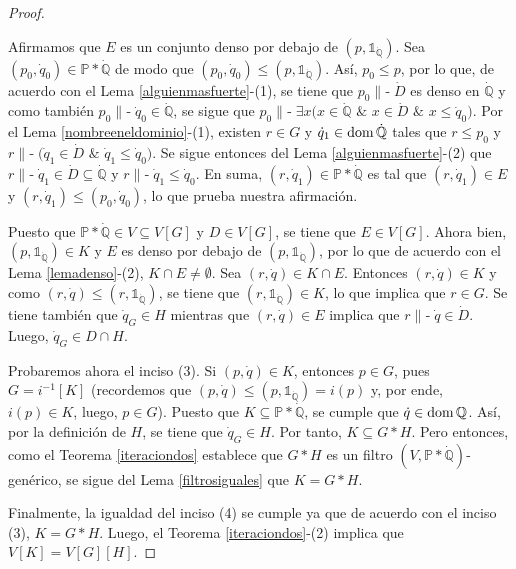 \documentclass[11pt]{unam_tesis1}
\theoremstyle{MyThmStyle}
\theoremstyle{definition}
\theoremstyle{plain}
\theoremstyle{remark}
\def\dom{\mathop{\rm dom}\nolimits}
\def\forces{\mathop{\parallel\!\!\!-}\nolimits}
\let\Vdash\forces
\let\leq\leqslant
\begin{document}
\begin{proof}
\begin{center}
\end{center}

Afirmamos que $E$ es un conjunto denso por debajo de $(p,\mathds 1_{\dot{\mathbb Q}})$. Sea $(p_0,\dot{q}_0)\in \mathbb P*\dot{\mathbb Q}$ de modo que $(p_0,\dot{q}_0)\leq (p,\mathds 1_{\dot{\mathbb Q}})$. As\'i, $p_0\leq p$, por lo que, de acuerdo con el Lema \ref{alguienmasfuerte}-(1), se tiene que $p_0\Vdash \dot D$ es denso en $\dot{\mathbb Q}$ y como tambi\'en $p_0\Vdash \dot q_0\in \dot{\mathbb Q}$, se sigue que $p_0\Vdash \exists x(x\in \dot{\mathbb Q}$ $\&$ $x\in \dot D$ $\&$ $x\leq \dot q_0 )$. Por el Lema \ref{nombreeneldominio}-(1), existen $r\in G$ y $\dot q_1\in \dom\dot{\mathbb Q}$ tales que $r\leq p_0$ y $r\Vdash (\dot q_1\in \dot D$ $\&$ $\dot q_1\leq \dot q_0)$. Se sigue entonces del Lema \ref{alguienmasfuerte}-(2) que $r\Vdash \dot q_1\in \dot D\subseteq \dot{\mathbb Q}$ y $r\Vdash \dot q_1\leq \dot q_0$. En suma, $(r,\dot q_1)\in \mathbb P*\dot{\mathbb Q}$ es tal que $(r,\dot q_1)\in E$ y $(r,\dot q_1)\leq (p_0,\dot q_0)$, lo que prueba nuestra afirmaci\'on.

Puesto que $\mathbb P*\dot{\mathbb Q}\in V\subseteq V[G]$ y $D\in V[G]$, se tiene que $E\in V[G]$. Ahora bien, $(p,\mathds 1_{\dot{\mathbb Q}})\in K$ y $E$ es denso por debajo de $(p,\mathds 1_{\dot{\mathbb Q}})$, por lo que de acuerdo con el Lema \ref{lemadenso}-(2), $K\cap E\neq \emptyset$. Sea $(r,\dot q)\in K\cap E$. Entonces $(r,\dot q)\in K$ y como  $(r,\dot q)\leq (r,\mathds 1_{\dot{\mathbb Q}})$, se tiene que $(r,\mathds 1_{\dot{\mathbb Q}})\in K$, lo que implica que $r\in G$. Se tiene tambi\'en que $\dot q_G\in H$ mientras que $(r,\dot q)\in E$ implica que $r\Vdash \dot q\in \dot D$. Luego, $\dot q_G\in D\cap H$.

Probaremos ahora el inciso (3). Si $(p,\dot q)\in K$, entonces $p\in G$, pues $G=i^{-1}[K]$ (recordemos que $(p,\dot q) \leq (p,\mathds 1_{\dot{\mathbb Q}}) = i(p)$ y, por ende, $i(p)\in K$, luego, $p\in G$). Puesto que $K\subseteq \mathbb P*\dot{\mathbb Q}$, se cumple que $\dot q\in \dom \mathbb Q$. As\'i, por la definici\'on de $H$, se tiene que $\dot q_G\in H$. Por tanto, $K\subseteq G*H$. Pero entonces, como el Teorema \ref{iteraciondos} establece que $G*H$ es un filtro $(V,\mathbb P*\dot{\mathbb Q})$-gen\'erico, se sigue del Lema \ref{filtrosiguales} que $K=G*H$.

Finalmente, la igualdad del inciso (4) se cumple ya que de acuerdo con el inciso (3), $K=G*H$. Luego, el Teorema \ref{iteraciondos}-(2) implica que $V[K]=V[G][H]$.
\end{proof}
\end{document}

